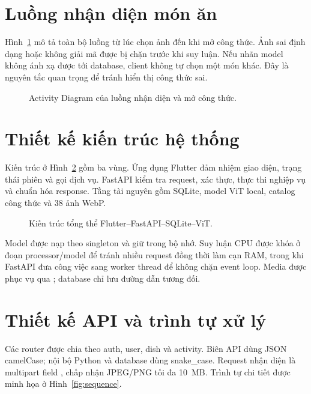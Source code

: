 \section{Luồng nhận diện món ăn}

Hình~\ref{fig:activity} mô tả toàn bộ luồng từ lúc chọn ảnh đến khi mở công
thức. Ảnh sai định dạng hoặc không giải mã được bị chặn trước khi suy luận.
Nếu nhãn model không ánh xạ được tới database, client không tự chọn một món
khác. Đây là nguyên tắc quan trọng để tránh hiển thị công thức sai.

\begin{figure}[p]
\centering
\resizebox{!}{0.72\textheight}{}
\caption{Activity Diagram của luồng nhận diện và mở công thức.}
\label{fig:activity}
\end{figure}
\clearpage

\section{Thiết kế kiến trúc hệ thống}

Kiến trúc ở Hình~\ref{fig:architecture} gồm ba vùng. Ứng dụng Flutter đảm
nhiệm giao diện, trạng thái phiên và gọi dịch vụ. FastAPI kiểm tra request,
xác thực, thực thi nghiệp vụ và chuẩn hóa response. Tầng tài nguyên gồm
SQLite, model ViT local, catalog công thức và 38 ảnh WebP.

\begin{figure}[htbp]
\centering
\resizebox{0.96\textwidth}{!}{}
\caption{Kiến trúc tổng thể Flutter--FastAPI--SQLite--ViT.}
\label{fig:architecture}
\end{figure}

Model được nạp theo singleton và giữ trong bộ nhớ. Suy luận CPU được khóa ở
đoạn processor/model để tránh nhiều request đồng thời làm cạn RAM, trong khi
FastAPI đưa công việc sang worker thread để không chặn event loop. Media được
phục vụ qua ; database chỉ lưu đường dẫn tương đối.

\clearpage
\section{Thiết kế API và trình tự xử lý}

Các router được chia theo auth, user, dish và activity. Biên API dùng JSON
camelCase; nội bộ Python và database dùng snake\_case. Request nhận diện là
multipart field , chấp nhận JPEG/PNG tối đa 10~MB. Trình tự chi
tiết được minh họa ở Hình~\ref{fig:sequence}.


